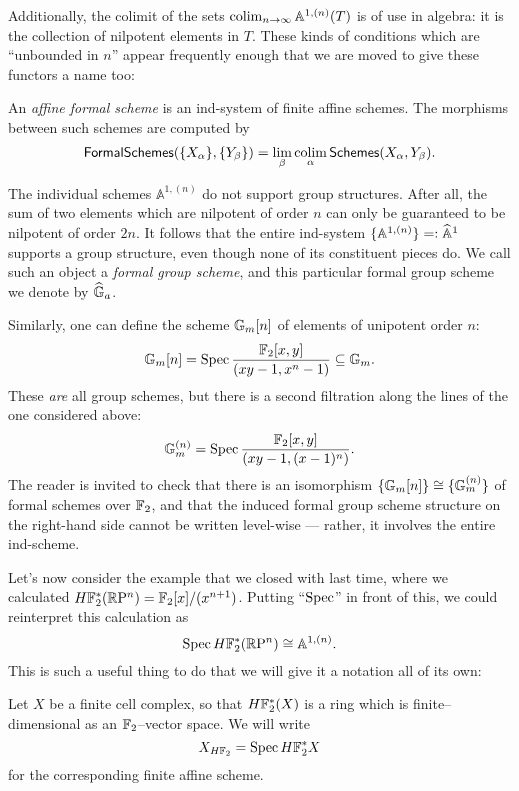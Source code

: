 Additionally, the colimit of the sets $\operatorname*{colim}_{n \to \infty} \mathbb A^{1,(n)}(T)$ is of use in algebra: it is the collection of nilpotent elements in $T$.  These kinds of conditions which are ``unbounded in $n$'' appear frequently enough that we are moved to give these functors a name too:
\begin{definition}
An \textit{affine formal scheme} is an ind-system of finite affine schemes.  The morphisms between such schemes are computed by \[\mathsf{FormalSchemes}(\{X_\alpha\}, \{Y_\beta\}) = \lim_\beta \operatorname*{colim}_\alpha \mathsf{Schemes}(X_\alpha, Y_\beta).\]
\end{definition}

\begin{example}\label{FormalGaExample}
The individual schemes $\mathbb A^{1, (n)}$ do not support group structures.  After all, the sum of two elements which are nilpotent of order $n$ can only be guaranteed to be nilpotent of order $2n$.  It follows that the entire ind-system $\{\mathbb A^{1, (n)}\} =: \widehat{\mathbb{A}}^1$ supports a group structure, even though none of its constituent pieces do.  We call such an object a \textit{formal group scheme}, and this particular formal group scheme we denote by $\widehat{\mathbb G}_a$.
\end{example}

\begin{example}
Similarly, one can define the scheme $\mathbb G_m[n]$ of elements of unipotent order $n$: \[\mathbb G_m[n] = \operatorname{Spec} \frac{\mathbb F_2[x,y]}{(xy - 1, x^n - 1)} \subseteq \mathbb G_m.\]  These \emph{are} all group schemes, but there is a second filtration along the lines of the one considered above: \[\mathbb G_m^{(n)} = \operatorname{Spec} \frac{\mathbb F_2[x,y]}{(xy - 1, (x - 1)^n)}.\]  The reader is invited to check that there is an isomorphism $\{\mathbb G_m[n]\} \cong \{\mathbb G_m^{(n)}\}$ of formal schemes over $\mathbb F_2$, and that the induced formal group scheme structure on the right-hand side cannot be written level-wise --- rather, it involves the entire ind-scheme.
\end{example}

Let's now consider the example that we closed with last time, where we calculated $H\mathbb F_2^*(\mathbb R\mathrm P^n) = \mathbb F_2[x] / (x^{n+1})$.  Putting ``$\operatorname{Spec}$'' in front of this, we could reinterpret this calculation as \[\operatorname{Spec} H\mathbb F_2^*(\mathbb R\mathrm P^n) \cong \mathbb A^{1, (n)}.\]  This is such a useful thing to do that we will give it a notation all of its own:

\begin{definition}
Let $X$ be a finite cell complex, so that $H\mathbb F_2^*(X)$ is a ring which is finite--dimensional as an $\mathbb F_2$--vector space.  We will write \[X_{H\mathbb F_2} = \operatorname{Spec} H\mathbb F_2^* X\] for the corresponding finite affine scheme.
\end{definition}

